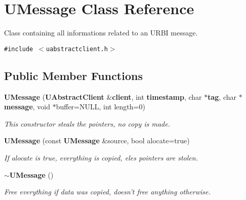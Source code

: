 \section{UMessage Class Reference}
\label{classUMessage}
Class containing all informations related to an URBI message.  


{\tt \#include $<$uabstractclient.h$>$}

\subsection*{Public Member Functions}
\begin{CompactItemize}
\item 
{\bf UMessage} ({\bf UAbstract\-Client} \&{\bf client}, int {\bf timestamp}, char $\ast${\bf tag}, char $\ast${\bf message}, void $\ast$buffer=NULL, int length=0)\label{classUMessage_a0}

\begin{CompactList}\small\item\em This constructor steals the pointers, no copy is made. \item\end{CompactList}\item 
{\bf UMessage} (const {\bf UMessage} \&source, bool alocate=true)\label{classUMessage_a1}

\begin{CompactList}\small\item\em If alocate is true, everything is copied, eles pointers are stolen. \item\end{CompactList}\item 
{\bf $\sim$UMessage} ()\label{classUMessage_a2}

\begin{CompactList}\small\item\em Free everything if data was copied, doesn't free anything otherwise. \item\end{CompactList}\end{CompactItemize}
